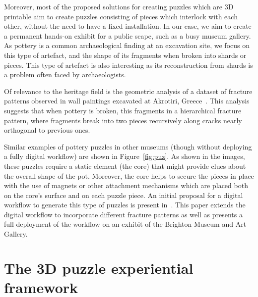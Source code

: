 \documentclass[acmlarge,screen,dvipsnames]{acmart}
\begin{document}
Moreover, most of the proposed solutions for creating puzzles which
are 3D printable aim to create puzzles consisting of pieces which
interlock with each other, without the need to have a fixed
installation. In our case, we aim to create a permanent hands-on
exhibit for a public scape, such as a busy museum gallery. As pottery
is a common archaeological finding at an excavation site, we focus on
this type of artefact, and the shape of its fragments when broken into
shards or pieces. This type of artefact is also interesting as its
reconstruction from shards is a problem often faced by archaeologists.

Of relevance to the heritage field is the geometric analysis of a
dataset of fracture patterns observed in wall paintings excavated at
Akrotiri, Greece~\cite{Shin:2012:ASF:2362402.2362404}. This analysis
suggests that when pottery is broken, this fragments in a hierarchical
fracture pattern, where fragments break into two pieces recursively
along cracks nearly orthogonal to previous ones.

Similar examples of pottery puzzles in other museums (though without
deploying a fully digital workflow) are shown in
Figure~\ref{fig:puz}. As shown in the images, these puzzles require a
static element (the core) that might provide clues about the overall
shape of the pot. Moreover, the core helps to secure the pieces in
place with the use of magnets or other attachment mechanisms which are
placed both on the core's surface and on each puzzle piece. An initial
proposal for a digital workflow to generate this type of puzzles is
present in~\cite{01763a4734614c50ab9f408cdd0f5470}. This paper extends
the digital workflow to incorporate different fracture patterns as
well as presents a full deployment of the workflow on an exhibit of
the Brighton Museum and Art Gallery.




\section{The 3D puzzle experiential framework}
\label{requirements}
\end{document}
